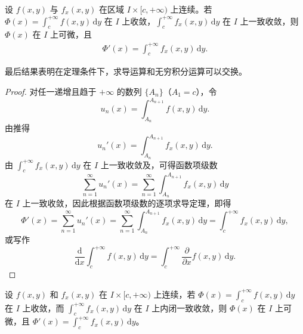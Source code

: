 \documentclass[../../main.tex]{subfiles}
\begin{document}
\begin{theorem}[可微性]
设 \( f(x,y) \) 与 \( f_x(x,y) \) 在区域 \( I \times [c, +\infty) \) 上连续。若 \( \Phi(x) = \int_{c}^{+\infty} f(x,y) \, \mathrm{d}y \) 在 \( I \) 上收敛，\( \int_{c}^{+\infty} f_x(x,y) \, \mathrm{d}y \) 在 \( I \) 上一致收敛，则 \( \Phi(x) \) 在 \( I \) 上可微，且
\begin{align}\label{eq::::--34802jrw4f345634t}
\Phi'(x) = \int_{c}^{+\infty} f_x(x,y) \, \mathrm{d}y.
\end{align}
\end{theorem}
\begin{note}
最后结果表明在定理条件下，求导运算和无穷积分运算可以交换。
\end{note}
\begin{proof}
对任一递增且趋于 \( +\infty \) 的数列 \( \{A_n\} \)（\( A_1 = c \)），令
\[
u_n(x) = \int_{A_n}^{A_{n+1}} f(x,y) \, \mathrm{d}y.
\]
由推得
\[
u_n'(x) = \int_{A_n}^{A_{n+1}} f_x(x,y) \, \mathrm{d}y.
\]
由 \( \int_{c}^{+\infty} f_x(x,y) \, \mathrm{d}y \) 在 \( I \) 上一致收敛及，可得函数项级数
\[
\sum_{n=1}^{\infty} u_n'(x) = \sum_{n=1}^{\infty} \int_{A_n}^{A_{n+1}} f_x(x,y) \, \mathrm{d}y
\]
在 \( I \) 上一致收敛，因此根据函数项级数的逐项求导定理，即得
\[
\Phi'(x) = \sum_{n=1}^{\infty} u_n'(x) = \sum_{n=1}^{\infty} \int_{A_n}^{A_{n+1}} f_x(x,y) \, \mathrm{d}y = \int_{c}^{+\infty} f_x(x,y) \, \mathrm{d}y,
\]
或写作
\[
\frac{\mathrm{d}}{\mathrm{d}x} \int_{c}^{+\infty} f(x,y) \, \mathrm{d}y = \int_{c}^{+\infty} \frac{\partial}{\partial x} f(x,y) \, \mathrm{d}y.
\]

\end{proof}

\begin{corollary}
设 \( f(x,y) \) 和 \( f_x(x,y) \) 在 \( I \times [c, +\infty) \) 上连续，若 \( \Phi(x) = \int_{c}^{+\infty} f(x,y) \, \mathrm{d}y \) 在 \( I \) 上收敛，而 \( \int_{c}^{+\infty} f_x(x,y) \, \mathrm{d}y \) 在 \( I \) 上内闭一致收敛，则 \( \Phi(x) \) 在 \( I \) 上可微，且 \( \Phi'(x) = \int_{c}^{+\infty} f_x(x,y) \, \mathrm{d}y \)。
\end{corollary}
\end{document}
